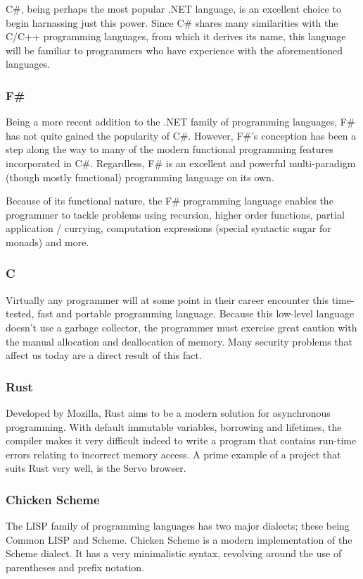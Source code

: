 \documentclass{article}
\begin{document}
C\#, being perhaps the most popular .NET language, is an excellent choice to begin harnassing just this power.
Since C\# shares many similarities with the C/C++ programming languages, from which it derives its name,
this language will be familiar to programmers who have experience with the aforementioned languages.

\subsubsection{F\#}
Being a more recent addition to the .NET family of programming languages, F\# has not quite gained the popularity of C\#.
However, F\#'s conception has been a step along the way to many of the modern functional programming features incorporated in C\#.
Regardless, F\# is an excellent and powerful multi-paradigm (though mostly functional) programming language on its own.

Because of its functional nature, the F\# programming language enables the programmer to tackle problems using
recursion, higher order functions, partial application / currying, computation expressions (special syntactic sugar for monads)  and more.

\subsubsection{C}
Virtually any programmer will at some point in their career encounter this time-tested, fast and portable programming language.
Because this low-level language doesn't use a garbage collector, the programmer must exercise great caution with the manual allocation
and deallocation of memory. Many security problems that affect us today are a direct result of this fact.

\subsubsection{Rust}
Developed by Mozilla, Rust aims to be a modern solution for asynchronous programming.
With default immutable variables, borrowing and lifetimes, the compiler makes it very difficult indeed to
write a program that contains run-time errors relating to incorrect memory access.
A prime example of a project that suits Rust very well, is the Servo browser.

\subsubsection{Chicken Scheme}
The LISP family of programming languages has two major dialects; these being Common LISP and Scheme.
Chicken Scheme is a modern implementation of the Scheme dialect.
It has a very minimalistic syntax, revolving around the use of parentheses and prefix notation.
\end{document}
